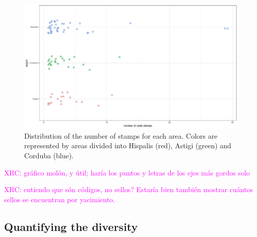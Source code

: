 \documentclass[review]{elsarticle}
\newcommand{\memo}[2]{\textcolor{#1}{#2}}
\newcommand{\xavi}[1]{\memo{magenta}{XRC: #1\\}}
\begin{document}
\begin{figure}[htp]
	\centering
\includegraphics[width=\linewidth]{figs/frequency}
\caption{Distribution of the number of stamps for each area. Colors are represented by areas divided into Hispalis (red), Astigi (green) and Corduba (blue).}
\label{frequency}
\end{figure} 

\xavi{gráfico molón, y útil; haría los puntos y letras de los ejes más gordos solo}

\xavi{entiendo que són códigos, no sellos? Estaría bien también mostrar cuántos sellos se encuentran por yacimiento.}




\subsection{Quantifying the diversity}
\end{document}
